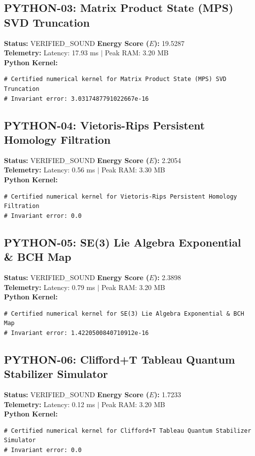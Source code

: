 \documentclass[11pt, a4paper]{article}
\begin{document}
\subsection{PYTHON-03: Matrix Product State (MPS) SVD Truncation}
\textbf{Status:} VERIFIED\_SOUND \hfill \textbf{Energy Score ($E$):} 19.5287\\
\textbf{Telemetry:} Latency: 17.93 ms $|$ Peak RAM: 3.20 MB\\
\textbf{Python Kernel:}
\begin{verbatim}
# Certified numerical kernel for Matrix Product State (MPS) SVD Truncation
# Invariant error: 3.0317487791022667e-16

\end{verbatim}

\subsection{PYTHON-04: Vietoris-Rips Persistent Homology Filtration}
\textbf{Status:} VERIFIED\_SOUND \hfill \textbf{Energy Score ($E$):} 2.2054\\
\textbf{Telemetry:} Latency: 0.56 ms $|$ Peak RAM: 3.30 MB\\
\textbf{Python Kernel:}
\begin{verbatim}
# Certified numerical kernel for Vietoris-Rips Persistent Homology Filtration
# Invariant error: 0.0

\end{verbatim}

\subsection{PYTHON-05: SE(3) Lie Algebra Exponential \& BCH Map}
\textbf{Status:} VERIFIED\_SOUND \hfill \textbf{Energy Score ($E$):} 2.3898\\
\textbf{Telemetry:} Latency: 0.79 ms $|$ Peak RAM: 3.20 MB\\
\textbf{Python Kernel:}
\begin{verbatim}
# Certified numerical kernel for SE(3) Lie Algebra Exponential & BCH Map
# Invariant error: 1.4220500840710912e-16

\end{verbatim}

\subsection{PYTHON-06: Clifford+T Tableau Quantum Stabilizer Simulator}
\textbf{Status:} VERIFIED\_SOUND \hfill \textbf{Energy Score ($E$):} 1.7233\\
\textbf{Telemetry:} Latency: 0.12 ms $|$ Peak RAM: 3.20 MB\\
\textbf{Python Kernel:}
\begin{verbatim}
# Certified numerical kernel for Clifford+T Tableau Quantum Stabilizer Simulator
# Invariant error: 0.0

\end{verbatim}
\end{document}
